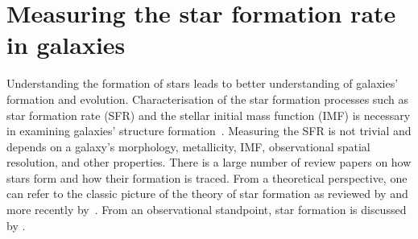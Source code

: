 

\section{Measuring the star formation rate in galaxies} 
\label{sec: sfr_intro}
Understanding the formation of stars leads to better understanding of galaxies' formation and evolution. 
Characterisation of the star formation processes such as star formation rate (SFR) and the stellar initial mass function (IMF) is necessary in examining galaxies' structure formation~\citep{McKee07}. 
Measuring the SFR is not trivial and depends on a galaxy's morphology, metallicity, IMF, observational spatial resolution, and other properties. 
There is a large number of review papers on how stars form and how their formation is traced. 
From a theoretical perspective, one can refer to the classic picture of the theory of star formation as reviewed by \cite{Shu87} and more recently by~\citep{McKee07}. 
From an observational standpoint, star formation is discussed by \cite[][and references therein]{Kennicutt98b, Kewley02, Calzetti13, Boquien10, Kennicutt12}.

